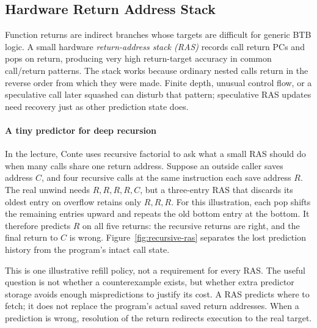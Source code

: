 \subsection{Hardware Return Address Stack}\label{subsec:auto-011}
Function returns are indirect branches whose targets are difficult for generic BTB logic.
A small hardware \textit{return-address stack (RAS)} records call return PCs and pops on return, producing very high return-target accuracy in common call/return patterns.
The stack works because ordinary nested calls return in the reverse order from which they were made.
Finite depth, unusual control flow, or a speculative call later squashed can disturb that pattern; speculative RAS updates need recovery just as other prediction state does.

\paragraph{A tiny predictor for deep recursion}
In the lecture, Conte uses recursive factorial to ask what a small RAS should do when many calls share one return address.
Suppose an outside caller saves address $C$, and four recursive calls at the same instruction each save address $R$.
The real unwind needs $R,R,R,R,C$, but a three-entry RAS that discards its oldest entry on overflow retains only $R,R,R$.
For this illustration, each pop shifts the remaining entries upward and repeats the old bottom entry at the bottom.
It therefore predicts $R$ on all five returns: the recursive returns are right, and the final return to $C$ is wrong.
Figure~\ref{fig:recursive-ras} separates the lost prediction history from the program's intact call state.



This is one illustrative refill policy, not a requirement for every RAS.
The useful question is not whether a counterexample exists, but whether extra predictor storage avoids enough mispredictions to justify its cost.
A RAS predicts where to fetch; it does not replace the program's actual saved return addresses.
When a prediction is wrong, resolution of the return redirects execution to the real target.

